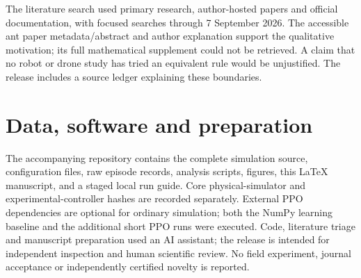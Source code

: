 \documentclass[10pt,a4paper,twocolumn]{article}
\newcommand{\1}{\mathbf 1}
\begin{document}
The literature search used primary research, author-hosted papers and official
documentation, with focused searches through 7 September 2026. The accessible
ant paper metadata/abstract and author explanation support the qualitative
motivation; its full mathematical supplement could not be retrieved. A claim
that no robot or drone study has tried an equivalent rule would be unjustified.
The release includes a source ledger explaining these boundaries.




\FloatBarrier


\section*{Data, software and preparation}
The accompanying repository contains the complete simulation source,
configuration files, raw episode records, analysis scripts, figures, this
\LaTeX{} manuscript, and a staged local run guide. Core physical-simulator and
experimental-controller hashes are recorded separately. External PPO dependencies are optional for ordinary simulation; both the NumPy learning baseline and the additional short PPO runs were executed. Code, literature triage and manuscript preparation used an AI assistant;
the release is intended for independent inspection and human scientific review.
No field experiment, journal acceptance or independently certified novelty is
reported.
\FloatBarrier


\appendix

\end{document}
